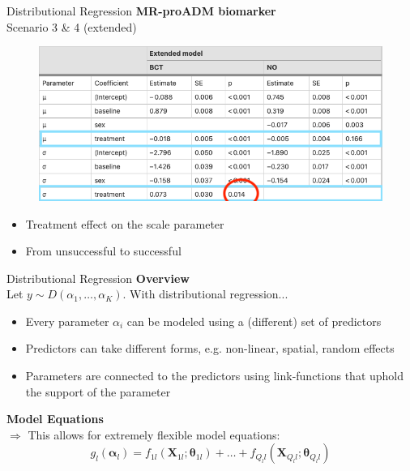 \documentclass[t]{beamer} 	%
\begin{document}
\begin{frame}{Distributional Regression}
	\textbf{MR-proADM biomarker} \\
	Scenario 3 \& 4 (extended)
	\begin{figure}
		\centering
		\includegraphics[width=\textwidth]{images/gillian_table2.png}
	\end{figure}
	\begin{itemize}
		\item Treatment effect on the scale parameter
		\item From unsuccessful to successful
	\end{itemize}
\end{frame}

\begin{frame}{Distributional Regression}
	\textbf{Overview} \\
	Let $y \sim D(\alpha_1, \ldots, \alpha_K)$. With distributional regression...
	\begin{itemize}
	  \item Every parameter $\alpha_i$ can be modeled using a (different) set of predictors
	  \item Predictors can take different forms, e.g. non-linear, spatial, random effects
	  \item Parameters are connected to the predictors using link-functions that uphold the support of the parameter
	\end{itemize}
	\textbf{Model Equations} \\
	$\Rightarrow$ This allows for extremely flexible model equations:
	\begin{equation}
	g_l(\boldsymbol{\alpha}_l) = f_{1l}(\mathbf{X}_{1l} ; \boldsymbol{\theta}_{1l}) + \ldots + f_{Q_{l}l}(\mathbf{X}_{Q_ll} ; \boldsymbol{\theta}_{Q_{l}l})
	\end{equation}
\end{frame}
\end{document}
